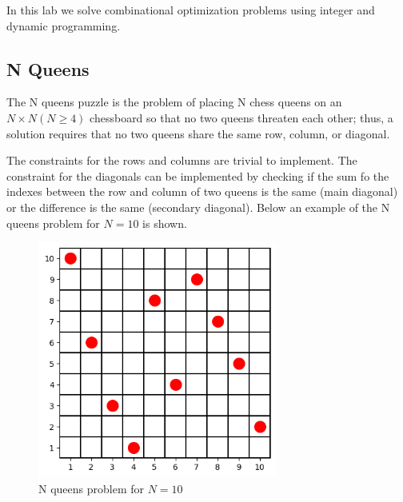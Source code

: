 In this lab we solve combinational optimization problems using integer and dynamic programming.
\subsection{N Queens}
The N queens puzzle is the problem of placing N chess queens on an $N\times N (N\ge 4)$ chessboard so that no two queens threaten each other; thus, a solution requires that no two queens share the same row, column, or diagonal.

The constraints for the rows and columns are trivial to implement. The constraint for the diagonals can be implemented by checking if the sum fo the indexes between the row and column of two queens is the same (main diagonal) or the difference is the same (secondary diagonal).
Below an example of the N queens problem for $N=10$ is shown.
\begin{figure}[H]
    \centering
    \includegraphics[width=0.7\textwidth]{lab11/imgs/nqueens.png}
    \caption{N queens problem for $N=10$}
    \label{fig:nqueens}
\end{figure}

